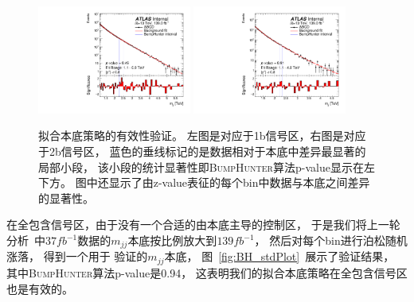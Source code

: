 \begin{figure}[!ht]
	\centering
	\includegraphics[width=0.45\textwidth]{figuresDijet/04-BackgroundEstimation/figure1_mbj.pdf}
	\includegraphics[width=0.45\textwidth]{figuresDijet/04-BackgroundEstimation/figure1_mbb.pdf}
	\caption{
	拟合本底策略的有效性验证。
	左图是对应于1b信号区，右图是对应于2b信号区，
	蓝色的垂线标记的是数据相对于本底中差异最显著的局部小段，
	该小段的统计显著性即\textsc{BumpHunter}算法p-value显示在左下方。
	图中还显示了由z-value表征的每个bin中数据与本底之间差异的显著性。
	}
	\label{fig:ABCDmbb}
\end{figure}



在全包含信号区，由于没有一个合适的由本底主导的控制区，
于是我们将上一轮分析~\cite{EXOT-2016-21}中$37fb^{-1}$数据的$m_{jj}$本底按比例放大到$139fb^{-1}$，
然后对每个bin进行泊松随机涨落，
得到一个用于
验证的$m_{jj}$本底，
图~\ref{fig:BH_stdPlot}~展示了验证结果，
其中\textsc{BumpHunter}算法p-value是0.94，
这表明我们的拟合本底策略在全包含信号区也是有效的。

